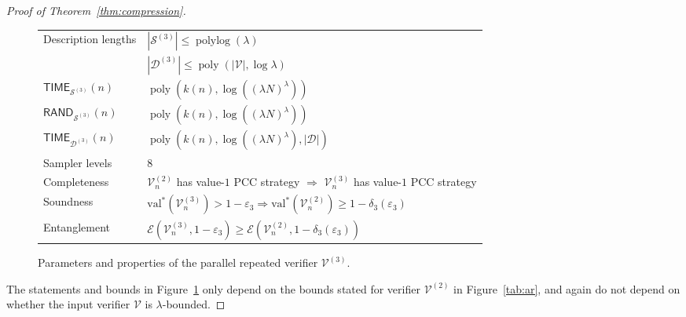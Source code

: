 \documentclass[11pt]{article}
\theoremstyle{definition}
\DeclareMathOperator{\poly}{poly}
\newcommand{\val}{\ensuremath{\mathrm{val}}}
\newcommand{\eps}{\varepsilon}
\DeclareMathOperator{\polylog}{polylog}
\newcommand{\abs}[1]{\left\vert {#1} \right\vert}
\newcommand{\sampler}{\mathcal{S}}
\newcommand{\decider}{\mathcal{D}}
\newcommand{\verifier}{\mathcal{V}}
\newcommand{\Ent}{\mathscr{E}}
\newcommand{\TIME}{\mathsf{TIME}}
\newcommand{\RAND}{\mathsf{RAND}}
\begin{document}
\begin{proof}[Proof of Theorem~\ref{thm:compression}]
  \begin{figure}[H]
    \begin{center}
      \renewcommand{\arraystretch}{1.2}
      \begin{tabularx}{0.9\textwidth}{l X}
        \toprule
        \multirow{2}{*}{Description lengths}
        & $|\sampler^{(3)}| \leq \polylog(\lambda)$ \\
        & $|\decider^{(3)}| \leq \poly(\abs{\verifier}, \log \lambda)$ \\
        $\TIME_{\sampler^{(3)}}(n)$
        & $\poly \left(k(n), \log \left ((\lambda N)^\lambda \right) \right)$ \\
        $\RAND_{\sampler^{(3)}}(n)$
        & $\poly \left (k(n), \log \left ((\lambda N)^\lambda \right) \right) $ \\
        $\TIME_{\decider^{(3)}}(n)$
        & $\poly \left (k(n),\log \left ((\lambda N)^\lambda \right),
          |\decider|  \right)$ \\
        Sampler levels & $8$ \\
        Completeness & $\verifier_n^{(2)}$ has value-$1$ PCC strategy
        $\Rightarrow$ $\verifier^{(3)}_n$ has value-$1$ PCC strategy \\
        Soundness & $\val^*(\verifier^{(3)}_n) > 1 - \eps_3 \Rightarrow
        \val^*(\verifier_n^{(2)}) \geq 1 - \delta_3(\eps_3)$ \\
        Entanglement & $\Ent(\verifier_n^{(3)},1 - \eps_3) \geq
        \Ent(\verifier_n^{(2)}, 1 - \delta_3(\eps_3))$ \\
        \bottomrule
      \end{tabularx}
      \caption{Parameters and properties of the parallel repeated verifier
        $\verifier^{(3)}$.}
      \label{tab:pr}
    \end{center}
  \end{figure}

  The statements and bounds in Figure~\ref{tab:pr} only depend on the bounds
  stated for verifier $\verifier^{(2)}$ in Figure~\ref{tab:ar}, and again do not
  depend on whether the input verifier $\verifier$ is $\lambda$-bounded.


\end{proof}
\end{document}
